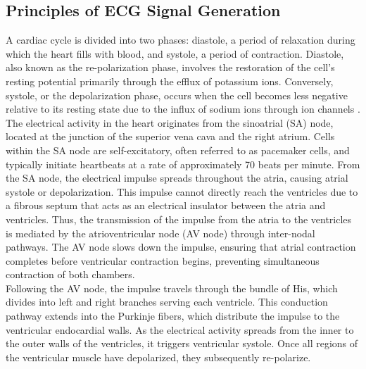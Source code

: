 \subsection{Principles of ECG Signal Generation}
\vspace{1em}
\noindent A cardiac cycle is divided into two phases: diastole, a period of relaxation during which the heart fills with blood, and systole, a period of contraction. Diastole, also known as the re-polarization phase, involves the restoration of the cell's resting potential primarily through the efflux of potassium ions. Conversely, systole, or the depolarization phase, occurs when the cell becomes less negative relative to its resting state due to the influx of sodium ions through ion channels \cite{hall2015}.\\

\noindent The electrical activity in the heart originates from the sinoatrial (SA) node, located at the junction of the superior vena cava and the right atrium. Cells within the SA node are self-excitatory, often referred to as pacemaker cells, and typically initiate heartbeats at a rate of approximately 70 beats per minute. From the SA node, the electrical impulse spreads throughout the atria, causing atrial systole or depolarization. This impulse cannot directly reach the ventricles due to a fibrous septum that acts as an electrical insulator between the atria and ventricles. Thus, the transmission of the impulse from the atria to the ventricles is mediated by the atrioventricular node (AV node) through inter-nodal pathways. The AV node slows down the impulse, ensuring that atrial contraction completes before ventricular contraction begins, preventing simultaneous contraction of both chambers.\\

\noindent Following the AV node, the impulse travels through the bundle of His, which divides into left and right branches serving each ventricle. This conduction pathway extends into the Purkinje fibers, which distribute the impulse to the ventricular endocardial walls. As the electrical activity spreads from the inner to the outer walls of the ventricles, it triggers ventricular systole. Once all regions of the ventricular muscle have depolarized, they subsequently re-polarize.

